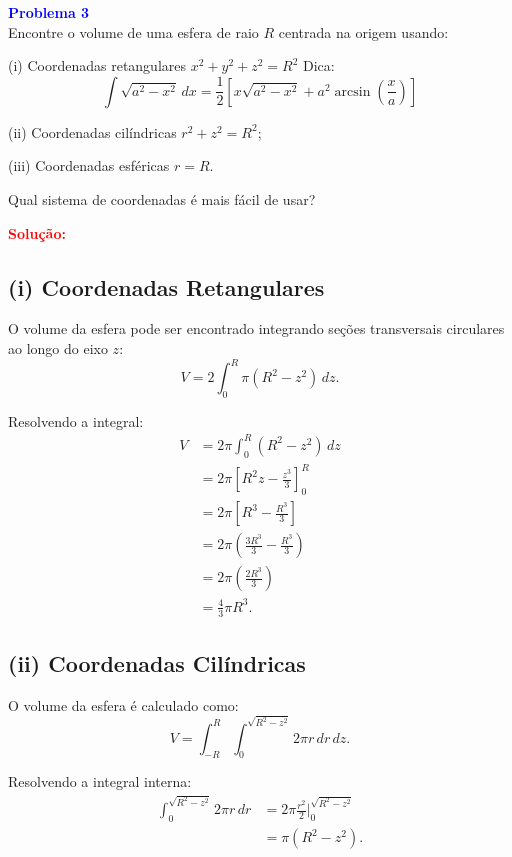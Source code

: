 \documentclass[a4paper,12pt]{article}
\begin{document}
\begin{flushleft}
\textbf{\textcolor{blue}{Problema 3}}\\
Encontre o volume de uma esfera de raio $R$ centrada na origem usando:

(i) Coordenadas retangulares $x^2 + y^2 + z^2 = R^2$ \newline
Dica:
\begin{equation}
\int \sqrt{a^2 - x^2} \, dx = \frac{1}{2} \left[ x\sqrt{a^2 - x^2} + a^2 \arcsin\left(\frac{x}{a}\right) \right]
\end{equation}

(ii) Coordenadas cilíndricas $r^2 + z^2 = R^2$;

(iii) Coordenadas esféricas $r = R$.

Qual sistema de coordenadas é mais fácil de usar?

\textcolor{red}{\textbf{Solução:}}\\

\subsection*{(i) Coordenadas Retangulares}
O volume da esfera pode ser encontrado integrando seções transversais circulares ao longo do eixo $z$:
\begin{equation}
V = 2 \int_0^R \pi (R^2 - z^2) \, dz.
\end{equation}

Resolvendo a integral:
\begin{align*}
V &= 2\pi \int_0^R (R^2 - z^2) \, dz \\
&= 2\pi \left[ R^2z - \frac{z^3}{3} \right]_0^R \\
&= 2\pi \left[ R^3 - \frac{R^3}{3} \right] \\
&= 2\pi \left( \frac{3R^3}{3} - \frac{R^3}{3} \right) \\
&= 2\pi \left( \frac{2R^3}{3} \right) \\
&= \frac{4}{3} \pi R^3.
\end{align*}

\subsection*{(ii) Coordenadas Cilíndricas}
O volume da esfera é calculado como:
\begin{equation}
V = \int_{-R}^{R} \int_0^{\sqrt{R^2 - z^2}} 2\pi r \, dr \, dz.
\end{equation}

Resolvendo a integral interna:
\begin{align*}
\int_0^{\sqrt{R^2 - z^2}} 2\pi r \, dr &= 2\pi \frac{r^2}{2} \Big|_0^{\sqrt{R^2 - z^2}} \\
&= \pi (R^2 - z^2).
\end{align*}


\end{flushleft}
\end{document}
